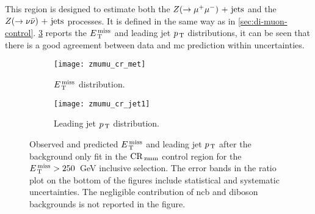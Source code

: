 This region is designed to estimate both the $Z (\rightarrow \mu^+ \mu^-)\mathrm{~+~jets}$ and the
$Z (\rightarrow \nu \bar{\nu})\mathrm{~+~jets}$ processes. It is defined in the same way as in
\cref{sec:di-muon-control}. \cref{fig:dimu_cr_plots} reports the $E_\mathrm{\, T}^\mathrm{\, miss}$ and
leading jet $p_\mathrm{\, T}$ distributions, it can be seen that there is a good agreement
between data and \gls{mc} prediction within uncertainties.
\begin{figure}[!th]
  \centering
  \begin{subfigure}[t]{.48\linewidth}
    \texttt{[image: zmumu\_cr\_met]}
    \caption{$E_\mathrm{\, T}^\mathrm{\, miss}$ distribution.}
    \label{fig:dimu_cr_met}
  \end{subfigure}
  \begin{subfigure}[t]{.48\linewidth}
    \texttt{[image: zmumu\_cr\_jet1]}
    \caption{Leading jet $p_\mathrm{\, T}$ distribution.}
    \label{fig:dimu_cr_jet1}
  \end{subfigure}
  \caption{Observed and predicted $E_\mathrm{\, T}^\mathrm{\, miss}$ and leading jet $p_\mathrm{\, T}$ after the
    background only fit in the $\mathrm{CR}_\mathrm{\, zmm}$ control region for the $E_\mathrm{\, T}^\mathrm{\, miss} > 250$~GeV
    inclusive selection. The error bands in the ratio plot on the bottom of the
    figures include statistical and systematic uncertainties. The negligible
    contribution of \gls{ncb} and diboson backgrounds is not reported in the
    figure.}
  \label{fig:dimu_cr_plots}
\end{figure}
